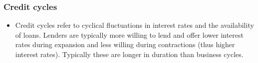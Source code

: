 \documentclass[../notes_compiled.tex]{subfiles}
\begin{document}
\begin{itemize}
\begin{enumerate}
\end{enumerate}

\end{itemize}

\subsubsection{Credit cycles}
\begin{itemize}
\item Credit cycles refer to cyclical fluctuations in interest rates and the availability of loans. Lenders are typically more willing to lend and offer lower interest rates during expansion and less willing during contractions (thus higher interest rates). Typically these are longer in duration than business cycles.
\end{itemize}
\end{document}
